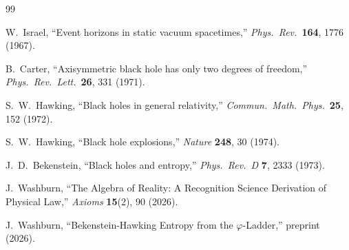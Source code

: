 \documentclass[12pt,a4paper]{article}
\theoremstyle{definition}
\theoremstyle{remark}
\begin{document}
\begin{thebibliography}{99}

W.~Israel, ``Event horizons in static vacuum spacetimes,''
\textit{Phys.\ Rev.}\ \textbf{164}, 1776 (1967).

B.~Carter, ``Axisymmetric black hole has only two degrees of freedom,''
\textit{Phys.\ Rev.\ Lett.}\ \textbf{26}, 331 (1971).

S.~W.~Hawking, ``Black holes in general relativity,''
\textit{Commun.\ Math.\ Phys.}\ \textbf{25}, 152 (1972).

S.~W.~Hawking, ``Black hole explosions,'' \textit{Nature} \textbf{248},
30 (1974).

J.~D.~Bekenstein, ``Black holes and entropy,'' \textit{Phys.\ Rev.\ D}
\textbf{7}, 2333 (1973).

J.~Washburn, ``The Algebra of Reality: A Recognition Science Derivation
of Physical Law,'' \textit{Axioms} \textbf{15}(2), 90 (2026).

J.~Washburn, ``Bekenstein-Hawking Entropy from the $\varphi$-Ladder,''
preprint (2026).

\end{thebibliography}
\end{document}
